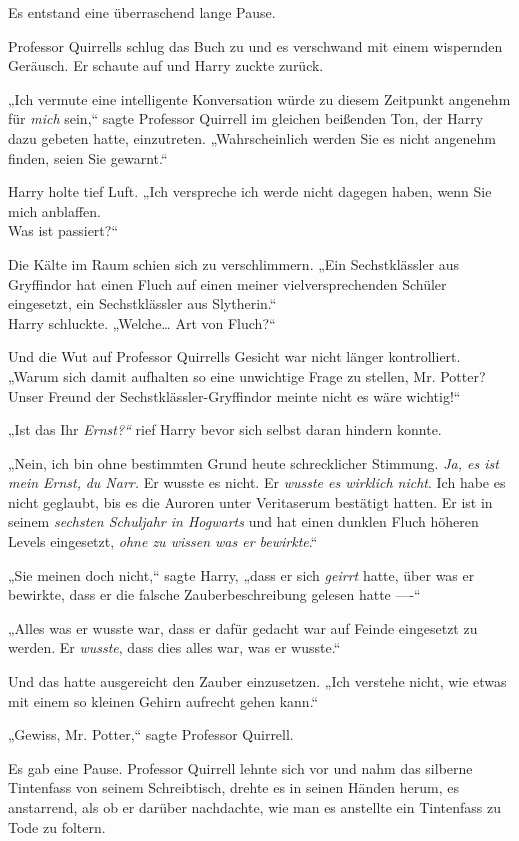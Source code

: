 {Es entstand eine überraschend lange Pause.

Professor Quirrells schlug das Buch zu und es verschwand mit einem wispernden Geräusch. Er schaute auf und Harry zuckte zurück.

„Ich vermute eine intelligente Konversation würde zu diesem Zeitpunkt angenehm für \emph{mich} sein,“ sagte Professor Quirrell im gleichen beißenden Ton, der Harry dazu gebeten hatte, einzutreten. „Wahrscheinlich werden Sie es nicht angenehm finden, seien Sie gewarnt.“

Harry holte tief Luft. „Ich verspreche ich werde nicht dagegen haben, wenn Sie mich anblaffen.\\ Was ist passiert?“

Die Kälte im Raum schien sich zu verschlimmern. „Ein Sechstklässler aus Gryffindor hat einen Fluch auf einen meiner vielversprechenden Schüler eingesetzt, ein Sechstklässler aus Slytherin.“\\ Harry schluckte. „Welche… Art von Fluch?“

Und die Wut auf Professor Quirrells Gesicht war nicht länger kontrolliert. „Warum sich damit aufhalten so eine unwichtige Frage zu stellen, Mr. Potter? Unser Freund der Sechstklässler-Gryffindor meinte nicht es wäre wichtig!“

„Ist das Ihr \emph{Ernst?“} rief Harry bevor sich selbst daran hindern konnte.

„Nein, ich bin ohne bestimmten Grund heute schrecklicher Stimmung. \emph{Ja, es ist mein Ernst,} \emph{du Narr.} Er wusste es nicht. Er \emph{wusste es wirklich nicht}. Ich habe es nicht geglaubt, bis es die Auroren unter Veritaserum bestätigt hatten. Er ist in seinem \emph{sechsten Schuljahr in Hogwarts} und hat einen dunklen Fluch höheren Levels eingesetzt, \emph{ohne zu wissen was er bewirkte}.“

„Sie meinen doch nicht,“ sagte Harry, „dass er sich \emph{geirrt} hatte, über was er bewirkte, dass er die falsche Zauberbeschreibung gelesen hatte ----“

„Alles was er wusste war, dass er dafür gedacht war auf Feinde eingesetzt zu werden. Er \emph{wusste}, dass dies alles war, was er wusste.“

Und das hatte ausgereicht den Zauber einzusetzen. „Ich verstehe nicht, wie etwas mit einem so kleinen Gehirn aufrecht gehen kann.“

„Gewiss, Mr. Potter,“ sagte Professor Quirrell.

Es gab eine Pause. Professor Quirrell lehnte sich vor und nahm das silberne Tintenfass von seinem Schreibtisch, drehte es in seinen Händen herum, es anstarrend, als ob er darüber nachdachte, wie man es anstellte ein Tintenfass zu Tode zu foltern.

}
